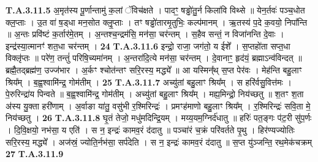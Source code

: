 \documentclass[17pt]{extarticle}
\begin{document}
                  \newline
                                                                  \textbf{ T.A.3.11.5} \newline
                  अ॒मृत॑स्य पू॒र्णान्तामु॑ क॒लां ॅविच॑क्षते ।  पादꣳ॒॒ षड्ढो॑तु॒र्न किला॑वि विथ्से ॥ येन॒र्तवः॑ पञ्च॒धोत क्ल॒॒प्ताः । उ॒त वा॑ ष॒ड्धा मन॒सोत क्लृ॒॒प्ताः । तꣳ षड्ढो॑तारमृ॒तुभिः॒ कल्प॑मानम् । ऋ॒तस्य॑ प॒दे क॒वयो॒ निपा᳚न्ति ॥ अ॒न्तः प्रवि॑ष्टं क॒र्तार॑मे॒तम् । अ॒न्तश्च॒न्द्रम॑सि॒ मन॑सा॒ चर॑न्तम् । स॒हैव सन्तं॒ न विजा॑नन्ति दे॒वाः ।  इन्द्र॑स्या॒त्मानꣳ॑ शत॒धा चर॑न्तम् । \textbf{ 24} \newline
                  \newline
                                                                  \textbf{ T.A.3.11.6} \newline
                  इन्द्रो॒ राजा॒ जग॑तो॒ य ईशे᳚ । स॒प्तहो॑ता सप्त॒धा विक्लृ॑प्तः ॥ परे॑ण॒ तन्तुं॑ परिषि॒च्यमा॑नम् । अ॒न्तरा॑दि॒त्ये मन॑सा॒ चर॑न्तम् । दे॒वानाꣳ॒॒ हृद॑यं॒ ब्रह्माऽन्व॑विन्दत् ॥ ब्रह्मै॒तद्ब्रह्म॑ण॒ उज्ज॑भार । अ॒र्कꣳ श्चोत॑न्तꣳ सरि॒रस्य॒ मद्ध्ये᳚ ॥ आ यस्मिन्᳚थ् स॒प्त पेर॑वः । मेह॑न्ति बहु॒लाꣳ श्रिय᳚म् । ब॒ह्व॒श्वामि॑न्द्र॒ गोम॑तीम् । \textbf{ 25} \newline
                  \newline
                                                                  \textbf{ T.A.3.11.7} \newline
                  अच्यु॑तां बहु॒लाꣳ श्रिय᳚म् । स हरि॑र्वसु॒वित्त॑मः ।  पे॒रुरिन्द्रा॑य पिन्वते ॥ ब॒ह्व॒श्वामि॑न्द्र॒ गोम॑तीम् । अच्यु॑तां बहु॒लाꣳ श्रिय᳚म् । मह्य॒मिन्द्रो॒ निय॑च्छतु ॥ श॒तꣳ श॒ता अ॑स्य यु॒क्ता हरी॑णाम् ।  अ॒र्वाङा या॑तु॒ वसु॑भी र॒श्मिरिन्द्रः॑ । प्रमꣳह॑माणो बहु॒लाꣳ श्रिय᳚म् ।  र॒श्मिरिन्द्रः॑ सवि॒ता मे॒ निय॑च्छतु । \textbf{ 26} \newline
                  \newline
                                                                  \textbf{ T.A.3.11.8} \newline
                  घृ॒तं तेजो॒ मधु॑मदिन्द्रि॒यम् । मय्य॒यम॒ग्निर्द॑धातु ॥ हरिः॑ पत॒ङ्गः प॑ट॒री सु॑प॒र्णः । दि॒वि॒क्षयो॒ नभ॑सा॒ य एति॑ ।  स न॒ इन्द्रः॑ कामव॒रं द॑दातु ॥ पञ्चा॑रं च॒क्रं परि॑वर्तते पृ॒थु । हिर॑ण्यज्योतिः सरि॒रस्य॒ मद्ध्ये᳚ । अज॑स्रं॒ ज्योति॒र्नभ॑सा॒ सर्प॑देति ।  स न॒ इन्द्रः॑ कामव॒रं द॑दातु ॥  स॒प्त यु॑ञ्जन्ति॒ रथ॒मेक॑चक्रम् \textbf{ 27} \newline
                  \newline
                                                                  \textbf{ T.A.3.11.9} \newline
\end{document}
